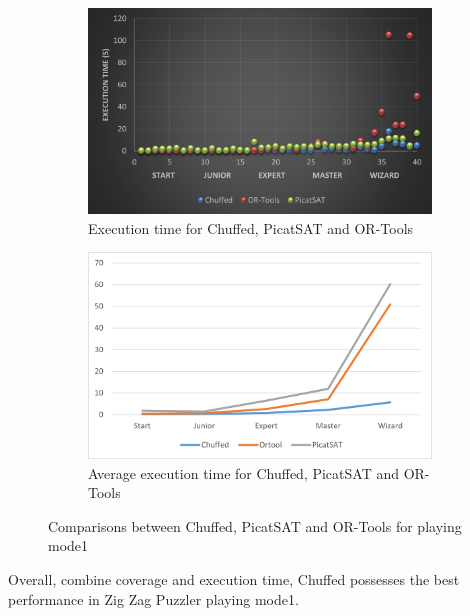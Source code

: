 \begin{figure}[htbp]
    \centering
    \begin{subfigure}[b]{0.48\textwidth}
     \includegraphics[width=\textwidth]{figs/time1three.png}
    \caption{Execution time for Chuffed, PicatSAT and OR-Tools}
    \label{fig:time1three}
    \end{subfigure}
    \begin{subfigure}[b]{0.48\textwidth}
     \includegraphics[width=\textwidth]{figs/mode1solverscomparison.png}
    \caption{Average execution time for Chuffed, PicatSAT and OR-Tools}
    \label{fig:time1threeslope}
    \end{subfigure}
    \caption{Comparisons between Chuffed, PicatSAT and OR-Tools for playing mode1}
\end{figure}
Overall, combine coverage and execution time, Chuffed possesses the best performance in Zig Zag Puzzler playing mode1.
